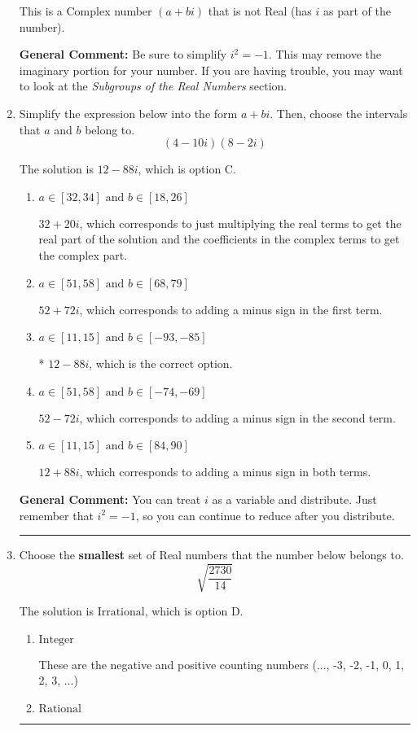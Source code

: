 \documentclass{extbook}[14pt]
\newcommand{\litem}[1]{\item #1

\rule{\textwidth}{0.4pt}}
\begin{document}
\begin{enumerate}
{\begin{enumerate}[label=\Alph*.]
This is a Complex number $(a+bi)$ that is not Real (has $i$ as part of the number).
\end{enumerate}

\textbf{General Comment:} Be sure to simplify $i^2 = -1$. This may remove the imaginary portion for your number. If you are having trouble, you may want to look at the \textit{Subgroups of the Real Numbers} section.
}
\litem{
Simplify the expression below into the form $a+bi$. Then, choose the intervals that $a$ and $b$ belong to.
\[ (4 - 10 i)(8 - 2 i) \]

The solution is \( 12 - 88 i \), which is option C.\begin{enumerate}[label=\Alph*.]
\item \( a \in [32, 34] \text{ and } b \in [18, 26] \)

 $32 + 20 i$, which corresponds to just multiplying the real terms to get the real part of the solution and the coefficients in the complex terms to get the complex part.
\item \( a \in [51, 58] \text{ and } b \in [68, 79] \)

 $52 + 72 i$, which corresponds to adding a minus sign in the first term.
\item \( a \in [11, 15] \text{ and } b \in [-93, -85] \)

* $12 - 88 i$, which is the correct option.
\item \( a \in [51, 58] \text{ and } b \in [-74, -69] \)

 $52 - 72 i$, which corresponds to adding a minus sign in the second term.
\item \( a \in [11, 15] \text{ and } b \in [84, 90] \)

 $12 + 88 i$, which corresponds to adding a minus sign in both terms.
\end{enumerate}

\textbf{General Comment:} You can treat $i$ as a variable and distribute. Just remember that $i^2=-1$, so you can continue to reduce after you distribute.
}
\litem{
Choose the \textbf{smallest} set of Real numbers that the number below belongs to.
\[ \sqrt{\frac{2730}{14}} \]

The solution is \( \text{Irrational} \), which is option D.\begin{enumerate}[label=\Alph*.]
\item \( \text{Integer} \)

These are the negative and positive counting numbers (..., -3, -2, -1, 0, 1, 2, 3, ...)
\item \( \text{Rational} \)


\end{enumerate}}
\end{enumerate}
\end{document}
